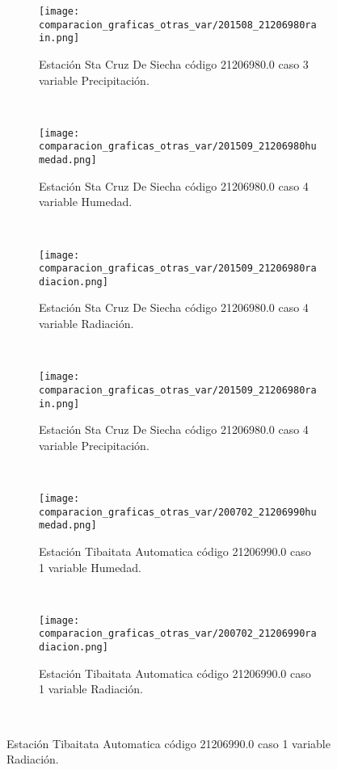 \begin{figure}[H]
\centering
\begin{subfigure}[normla]{0.4\textwidth}
\caption{Estación Sta Cruz De Siecha código 21206980.0 caso 3 variable Precipitación.}
\texttt{[image: comparacion\_graficas\_otras\_var/201508\_21206980rain.png]}
\end{subfigure}
~
\begin{subfigure}[normla]{0.4\textwidth}
\caption{Estación Sta Cruz De Siecha código 21206980.0 caso 4 variable Humedad.}
\texttt{[image: comparacion\_graficas\_otras\_var/201509\_21206980humedad.png]}
\end{subfigure}
~
\begin{subfigure}[normla]{0.4\textwidth}
\caption{Estación Sta Cruz De Siecha código 21206980.0 caso 4 variable Radiación.}
\texttt{[image: comparacion\_graficas\_otras\_var/201509\_21206980radiacion.png]}
\end{subfigure}
~
\begin{subfigure}[normla]{0.4\textwidth}
\caption{Estación Sta Cruz De Siecha código 21206980.0 caso 4 variable Precipitación.}
\texttt{[image: comparacion\_graficas\_otras\_var/201509\_21206980rain.png]}
\end{subfigure}
~
\begin{subfigure}[normla]{0.4\textwidth}
\caption{Estación Tibaitata Automatica código 21206990.0 caso 1 variable Humedad.}
\texttt{[image: comparacion\_graficas\_otras\_var/200702\_21206990humedad.png]}
\end{subfigure}
~
\begin{subfigure}[normla]{0.4\textwidth}
\caption{Estación Tibaitata Automatica código 21206990.0 caso 1 variable Radiación.}
\texttt{[image: comparacion\_graficas\_otras\_var/200702\_21206990radiacion.png]}
\end{subfigure}
~
\end{figure}
           
